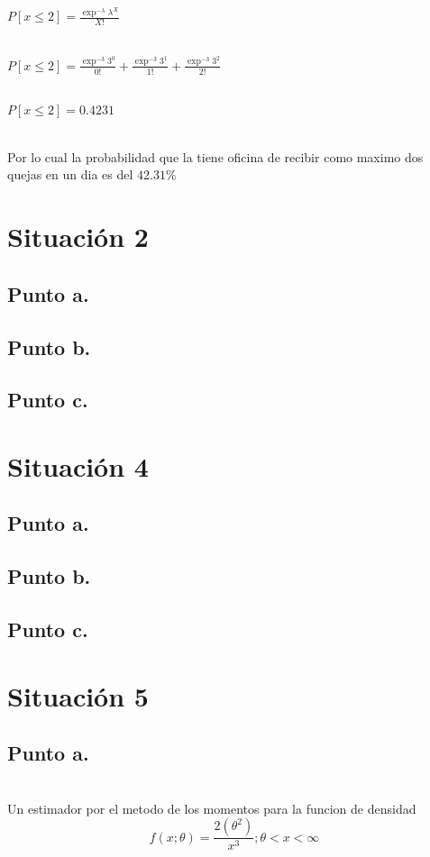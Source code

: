 \documentclass[letterpaper,12pt,onecolumn,titlepage]{article}
\begin{document}
~\\ $P[x\le2]= \frac{\exp^{-\lambda}\lambda^{X}}{X!}$

~\\ $P[x\le2]= \frac{\exp^{-3}3^{0}}{0!} + 
			 \frac{\exp^{-3}3^{1}}{1!} + 
			 \frac{\exp^{-3}3^{2}}{2!}$
			 
~\\ $P[x\le2]= 0.4231 $

~\\ Por lo cual la probabilidad que la tiene oficina de recibir como maximo dos quejas en un dia es del {$42.31\%$}

\pagebreak\section{Situaci\'{o}n 2}
\subsection{Punto a.}
\subsection{Punto b.} 
\subsection{Punto c.} 

\pagebreak\section{Situaci\'{o}n 4}
\subsection{Punto a.}
\subsection{Punto b.}
\subsection{Punto c.}

\pagebreak\section{Situaci\'{o}n 5}
\subsection{Punto a.}
~\\ Un estimador por el metodo de los momentos para la funcion de densidad 
$$f({x;\theta})= \frac{2(\theta^2)}{x^3} ; \theta<x<\infty$$
\end{document}
